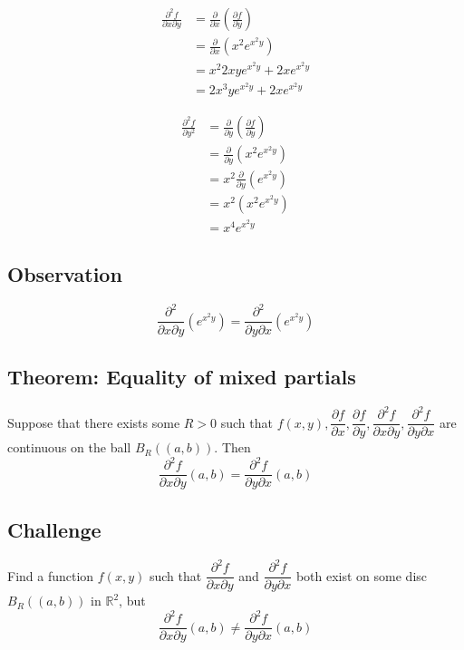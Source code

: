 \documentclass[11pt]{article}
\newcommand{\reals}{\mathbb{R}}
\begin{document}
\begin{align*}
\frac{\partial^2 f}{\partial x \partial y} &= \frac{\partial }{\partial x} \left( \frac{\partial f}{\partial y} \right) \\
&=  \frac{\partial }{\partial x} \left( x^2 e^{x^2 y} \right) \\
&= x^2 2xy e^{x^2y} + 2x e^{x^2y} \\
&= 2x^3 y e^{x^2y} + 2x e^{x^2y}
\end{align*}

\begin{align*}
\frac{\partial^2 f}{\partial y^2} &= \frac{\partial}{\partial y} \left( \frac{\partial f}{\partial y} \right) \\
&= \frac{\partial}{\partial y} \left( x^2 e^{x^2y} \right) \\
&= x^2 \frac{\partial}{\partial y} \left( e^{x^2y} \right) \\
&= x^2 \left( x^2 e^{x^2y} \right) \\
&= x^4 e^{x^2y}
\end{align*}

\subsection{Observation}
\[ \frac{\partial^2}{\partial x \partial y} \left( e^{x^2y} \right) = \frac{\partial^2}{\partial y \partial x} \left( e^{x^2y} \right) \]

\subsection{Theorem: Equality of mixed partials}
Suppose that there exists some $R>0$ such that $f(x,y), \dfrac{\partial f}{\partial x}, \dfrac{\partial f}{\partial y},  \dfrac{\partial^2 f}{\partial x \partial y}, \dfrac{\partial^2 f}{\partial y \partial x}$ are continuous on the ball $B_R((a, b))$. Then
\[ \frac{\partial^2 f}{\partial x \partial y}(a, b) = \frac{\partial^2 f}{\partial y \partial x}(a, b) \]

\subsection{Challenge}
Find a function $f(x, y)$ such that $\dfrac{\partial^2 f}{\partial x \partial y}$ and $\dfrac{\partial^2 f}{\partial y \partial x}$ both exist on some disc $B_R((a, b))$ in $\reals^2$, but 
\[ \frac{\partial^2 f}{\partial x \partial y}(a, b) \not = \frac{\partial^2 f}{\partial y \partial x}(a, b) \]
\end{document}
